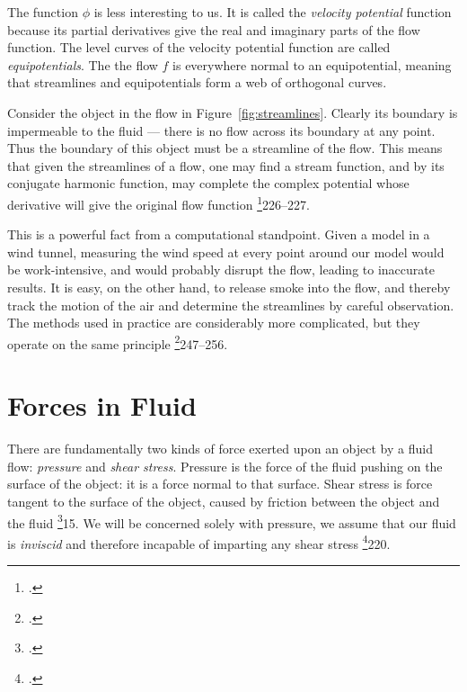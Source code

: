 \documentclass[letterpaper, twoside, 12 pt]{article}
\begin{document}
	The function $\phi$ is less interesting to us.
	It is called the \textit{velocity potential} function because its partial derivatives give the real and imaginary parts of the flow function.
	The level curves of the velocity potential function are called \textit{equipotentials}.
	The the flow $f$ is everywhere normal to an equipotential, meaning that streamlines and equipotentials form a web of orthogonal curves.

	Consider the object in the flow in Figure~\ref{fig:streamlines}.
	Clearly its boundary is impermeable to the fluid --- there is no flow across its boundary at any point.
	Thus the boundary of this object must be a streamline of the flow.
	This means that given the streamlines of a flow, one may find a stream function, and by its conjugate harmonic function, may complete the complex potential whose derivative will give the original flow function \footcite{motteler}{226--227}.

	This is a powerful fact from a computational standpoint.
	Given a model in a wind tunnel, measuring the wind speed at every point around our model would be work-intensive, and would probably disrupt the flow, leading to inaccurate results.
	It is easy, on the other hand, to release smoke into the flow, and thereby track the motion of the air and determine the streamlines by careful observation.
	The methods used in practice are considerably more complicated, but they operate on the same principle \footcite{anderson}{247--256}.

\section{Forces in Fluid} %
\label{sec:forces_in_fluid}

	There are fundamentally two kinds of force exerted upon an object by a fluid flow: \textit{pressure} and \textit{shear stress}.
	Pressure is the force of the fluid pushing on the surface of the object: it is a force normal to that surface.
	Shear stress is force tangent to the surface of the object, caused by friction between the object and the fluid \footcite{anderson}{15}.
	We will be concerned solely with pressure, we assume that our fluid is \textit{inviscid} and therefore incapable of imparting any shear stress \footcite{motteler}{220}.
\end{document}
